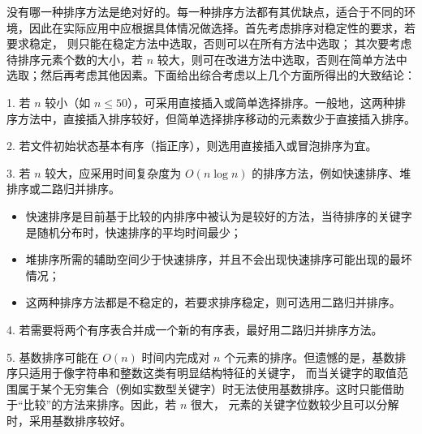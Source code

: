 \documentclass[lang=cn,newtx,10pt,scheme=chinese]{../elegantbook}
\begin{document}
没有哪一种排序方法是绝对好的。每一种排序方法都有其优缺点，适合于不同的环境，因此在实际应用中应根据具体情况做选择。首先考虑排序对稳定性的要求，若要求稳定，
则只能在稳定方法中选取，否则可以在所有方法中选取；
其次要考虑待排序元素个数的大小，若 $n$ 较大，则可在改进方法中选取，否则在简单方法中选取；然后再考虑其他因素。下面给出综合考虑以上几个方面所得出的大致结论：

1. 若 $n$ 较小（如 $n \leq 50$），可采用直接插入或简单选择排序。一般地，这两种排序方法中，直接插入排序较好，但简单选择排序移动的元素数少于直接插入排序。

2. 若文件初始状态基本有序（指正序），则选用直接插入或冒泡排序为宜。

3. 若 $n$ 较大，应采用时间复杂度为 $O(n \log n)$ 的排序方法，例如快速排序、堆排序或二路归并排序。
   \begin{itemize}
     \item 快速排序是目前基于比较的内排序中被认为是较好的方法，当待排序的关键字是随机分布时，快速排序的平均时间最少；
     \item 堆排序所需的辅助空间少于快速排序，并且不会出现快速排序可能出现的最坏情况；
     \item 这两种排序方法都是不稳定的，若要求排序稳定，则可选用二路归并排序。
   \end{itemize}

4. 若需要将两个有序表合并成一个新的有序表，最好用二路归并排序方法。

5. 基数排序可能在 $O(n)$ 时间内完成对 $n$ 个元素的排序。但遗憾的是，基数排序只适用于像字符串和整数这类有明显结构特征的关键字，
而当关键字的取值范围属于某个无穷集合（例如实数型关键字）时无法使用基数排序。这时只能借助于“比较”的方法来排序。因此，若 $n$ 很大，
元素的关键字位数较少且可以分解时，采用基数排序较好。
\end{document}
